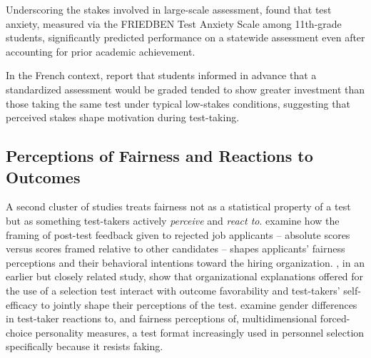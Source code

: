 \documentclass[11pt]{article}
\begin{document}
Underscoring the stakes involved in large-scale assessment, \citet{vonderembse2014highstakes} found that test anxiety, measured via the FRIEDBEN Test Anxiety Scale among 11th-grade students, significantly predicted performance on a statewide assessment even after accounting for prior academic achievement.

In the French context, \citet{fumel2017motivation} report that students informed in advance that a standardized assessment would be graded tended to show greater investment than those taking the same test under typical low-stakes conditions, suggesting that perceived stakes shape motivation during test-taking.

\subsection{Perceptions of Fairness and Reactions to Outcomes}

A second cluster of studies treats fairness not as a statistical property of a test but as something test-takers actively \emph{perceive} and \emph{react to}. \citet{feeney2022rejection} examine how the framing of post-test feedback given to rejected job applicants -- absolute scores versus scores framed relative to other candidates -- shapes applicants' fairness perceptions and their behavioral intentions toward the hiring organization. \citet{stierwalt2000explanations}, in an earlier but closely related study, show that organizational explanations offered for the use of a selection test interact with outcome favorability and test-takers' self-efficacy to jointly shape their perceptions of the test. \citet{zhou2024genderforced} examine gender differences in test-taker reactions to, and fairness perceptions of, multidimensional forced-choice personality measures, a test format increasingly used in personnel selection specifically because it resists faking.
\end{document}
